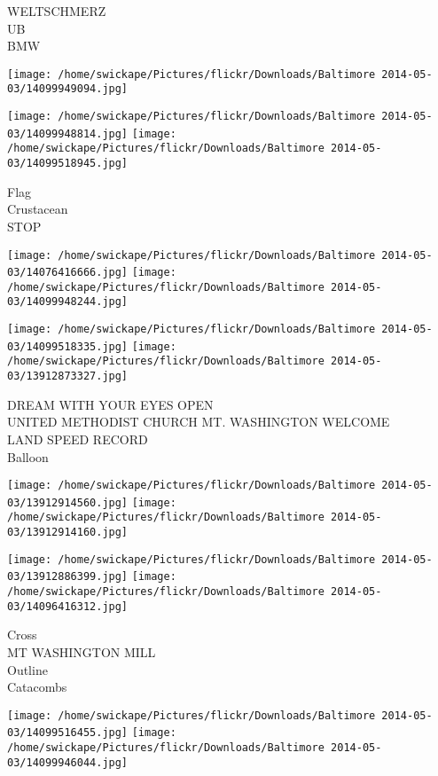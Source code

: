 \documentclass[10pt,letterpaper]{article}
\begin{document}
WELTSCHMERZ\\
UB\\
BMW
\pagebreak

\texttt{[image: /home/swickape/Pictures/flickr/Downloads/Baltimore 2014-05-03/14099949094.jpg]}

\vspace{0.25in}
\texttt{[image: /home/swickape/Pictures/flickr/Downloads/Baltimore 2014-05-03/14099948814.jpg]}
\texttt{[image: /home/swickape/Pictures/flickr/Downloads/Baltimore 2014-05-03/14099518945.jpg]}

Flag\\
Crustacean\\
STOP
\pagebreak

\texttt{[image: /home/swickape/Pictures/flickr/Downloads/Baltimore 2014-05-03/14076416666.jpg]}
\texttt{[image: /home/swickape/Pictures/flickr/Downloads/Baltimore 2014-05-03/14099948244.jpg]}

\texttt{[image: /home/swickape/Pictures/flickr/Downloads/Baltimore 2014-05-03/14099518335.jpg]}
\texttt{[image: /home/swickape/Pictures/flickr/Downloads/Baltimore 2014-05-03/13912873327.jpg]}

DREAM WITH YOUR EYES OPEN\\
UNITED METHODIST CHURCH MT. WASHINGTON WELCOME\\
LAND SPEED RECORD\\
Balloon
\pagebreak

\texttt{[image: /home/swickape/Pictures/flickr/Downloads/Baltimore 2014-05-03/13912914560.jpg]}
\texttt{[image: /home/swickape/Pictures/flickr/Downloads/Baltimore 2014-05-03/13912914160.jpg]}

\texttt{[image: /home/swickape/Pictures/flickr/Downloads/Baltimore 2014-05-03/13912886399.jpg]}
\texttt{[image: /home/swickape/Pictures/flickr/Downloads/Baltimore 2014-05-03/14096416312.jpg]}

Cross\\
MT WASHINGTON MILL\\
Outline\\
Catacombs
\pagebreak

\texttt{[image: /home/swickape/Pictures/flickr/Downloads/Baltimore 2014-05-03/14099516455.jpg]}
\texttt{[image: /home/swickape/Pictures/flickr/Downloads/Baltimore 2014-05-03/14099946044.jpg]}
\end{document}
